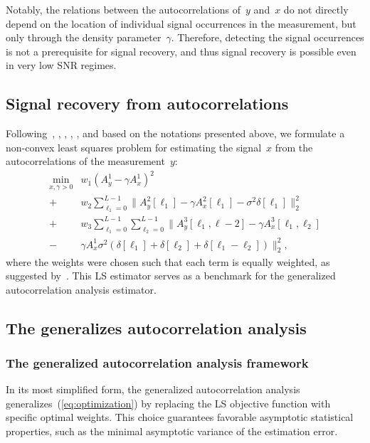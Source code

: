 \documentclass{article}
\begin{document}
Notably, the relations between the autocorrelations of~$y$ and~$x$ do not directly depend on the location of individual signal occurrences in the measurement, but only through the density parameter~$\gamma$. Therefore, detecting the signal occurrences is not a prerequisite for signal recovery, and thus signal recovery is possible even in very low SNR regimes.

\subsection{Signal recovery from autocorrelations}
\label{subsec:sig_recovery}
Following~\cite{bendory2019multi}, \cite{lan2020multi}, \cite{marshall2020image}, \cite{bendory2021multi}, \cite{kreymer2021two}, and based on the notations presented above, we formulate a non-convex least squares problem for estimating the signal~$x$ from the autocorrelations of the measurement~$y$:
\begin{align}
\label{eq:optimization}
\min_{x, \gamma > 0} &w_1 (A_y^1 - \gamma A_x^1)^2 \nonumber\\ +& w_2 \sum_{\ell_1 = 0}^{L - 1} \|A_y^2[\ell_1] - \gamma A_x^2[\ell_1] - \sigma^2 \delta[\ell_1]\|_2^2\nonumber\\ +& w_3 \sum_{\ell_1 = 0}^{L - 1} \sum_{\ell_2 = 0}^{L - 1} \|A_y^3[\ell_1, \ell-2] - \gamma A_x^3[\ell_1, \ell_2] \nonumber\\ -& \gamma A_{x}^1 \sigma^2 (\delta[\ell_1] + \delta[\ell_2] + \delta[\ell_1 - \ell_2])\|_2^2,
\end{align}
where the weights were chosen such that each term is equally weighted, as suggested by~\cite{bendory2019multi}. This LS estimator serves as a benchmark for the generalized autocorrelation analysis estimator.

\subsection{The generalizes autocorrelation analysis}
\label{subsec:generalized_ac}
\subsubsection{The generalized autocorrelation analysis framework}
\label{gmm:framwork}
In its most simplified form, the generalized autocorrelation analysis generalizes~(\ref{eq:optimization}) by replacing the LS objective function with specific optimal weights. This choice guarantees favorable asymptotic statistical properties, such as {the} minimal asymptotic variance of the estimation error.
\end{document}

